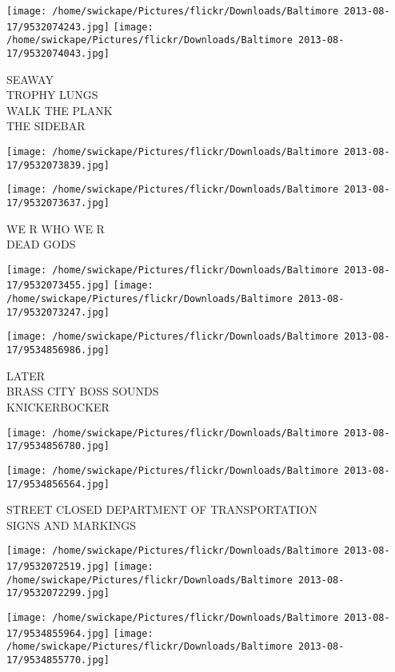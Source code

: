 \documentclass[10pt,letterpaper]{article}
\begin{document}
\texttt{[image: /home/swickape/Pictures/flickr/Downloads/Baltimore 2013-08-17/9532074243.jpg]}
\texttt{[image: /home/swickape/Pictures/flickr/Downloads/Baltimore 2013-08-17/9532074043.jpg]}

SEAWAY\\
TROPHY LUNGS\\
WALK THE PLANK\\
THE SIDEBAR
\pagebreak

\texttt{[image: /home/swickape/Pictures/flickr/Downloads/Baltimore 2013-08-17/9532073839.jpg]}

\vspace{0.25in}
\texttt{[image: /home/swickape/Pictures/flickr/Downloads/Baltimore 2013-08-17/9532073637.jpg]}

WE R WHO WE R\\
DEAD GODS
\pagebreak

\texttt{[image: /home/swickape/Pictures/flickr/Downloads/Baltimore 2013-08-17/9532073455.jpg]}
\texttt{[image: /home/swickape/Pictures/flickr/Downloads/Baltimore 2013-08-17/9532073247.jpg]}

\texttt{[image: /home/swickape/Pictures/flickr/Downloads/Baltimore 2013-08-17/9534856986.jpg]}

LATER\\
BRASS CITY BOSS SOUNDS\\
KNICKERBOCKER
\pagebreak

\texttt{[image: /home/swickape/Pictures/flickr/Downloads/Baltimore 2013-08-17/9534856780.jpg]}

\vspace{0.25in}
\texttt{[image: /home/swickape/Pictures/flickr/Downloads/Baltimore 2013-08-17/9534856564.jpg]}

STREET CLOSED DEPARTMENT OF TRANSPORTATION\\
SIGNS AND MARKINGS
\pagebreak

\texttt{[image: /home/swickape/Pictures/flickr/Downloads/Baltimore 2013-08-17/9532072519.jpg]}
\texttt{[image: /home/swickape/Pictures/flickr/Downloads/Baltimore 2013-08-17/9532072299.jpg]}

\texttt{[image: /home/swickape/Pictures/flickr/Downloads/Baltimore 2013-08-17/9534855964.jpg]}
\texttt{[image: /home/swickape/Pictures/flickr/Downloads/Baltimore 2013-08-17/9534855770.jpg]}
\end{document}
